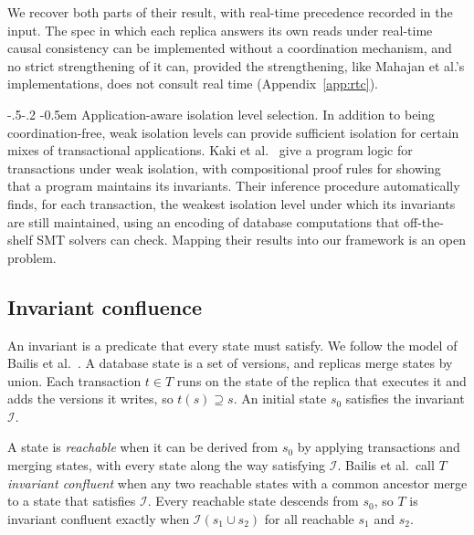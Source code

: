 \documentclass[sigconf]{cidr-2027}
\makeatletter
\theoremstyle{remark}
\renewcommand\paragraph{\@startsection{paragraph}{4}{\z@}%
  {-.5\baselineskip \@plus -2\p@ \@minus -.2\p@}%
  {-0.5em}%
  {\normalfont\bfseries}}
\makeatother
\begin{document}
We recover both parts of their result, with real-time precedence recorded in
the input. The spec in which each replica answers its own reads under
real-time causal consistency can be implemented without a coordination
mechanism, and no strict strengthening of it can, provided the strengthening,
like Mahajan et al.'s implementations, does not consult real time
(Appendix~\ref{app:rtc}).

\paragraph{Application-aware isolation level selection.}
In addition to being coordination-free, weak isolation levels can provide
sufficient isolation for certain mixes of transactional applications. Kaki et
al.~\cite{kaki2018alone} give a program logic for transactions under weak
isolation, with compositional proof rules for showing that a program maintains
its invariants. Their inference procedure automatically finds, for each
transaction, the weakest isolation level under which its invariants are still
maintained, using an encoding of database computations that off-the-shelf SMT
solvers can check. Mapping their results into our framework is an open
problem.

\subsection{Invariant confluence}
\label{sec:iconfluence-instance}

An invariant is a predicate that every state must satisfy. We follow the model
of Bailis et al.~\cite{bailis2014coordination}. A database state is a set of
versions, and replicas merge states by union. Each transaction $t\in T$ runs
on the state of the replica that executes it and adds the versions it writes,
so $t(s)\supseteq s$. An initial state $s_0$ satisfies the invariant
$\mathcal I$.

\textcolor{reviewed}{A state is \emph{reachable} when it can be derived from $s_0$ by applying
transactions and merging states, with every state along the way satisfying
$\mathcal I$.} Bailis et al.\ call $T$ \emph{invariant confluent} when any two
reachable states with a common ancestor merge to a state that satisfies
$\mathcal I$. Every reachable state descends from $s_0$, so $T$ is invariant
confluent exactly when $\mathcal I(s_1\cup s_2)$ for all
reachable $s_1$ and $s_2$.
\end{document}
